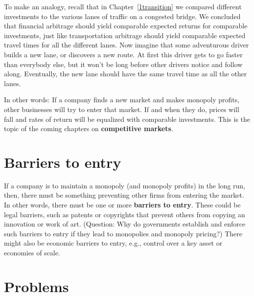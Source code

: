 To make an analogy, recall that in Chapter~\ref{1transition} we compared different investments to the various lanes of traffic on a congested bridge. We concluded that financial arbitrage should yield comparable expected returns for comparable investments, just like transportation arbitrage should yield comparable expected travel times for all the different lanes. Now imagine that some adventurous driver builds a new lane, or discovers a new route. At first this driver gets to go faster than everybody else, but it won't be long before other drivers notice and follow along. Eventually, the new lane should have the same travel time as all the other lanes.

In other words: If a company finds a new market and makes monopoly profits, other businesses will try to enter that market. If and when they do, prices will fall and rates of return will be equalized with comparable investments. This is the topic of the coming chapters on \textbf{competitive markets}.


\section{Barriers to entry}

If a company is to maintain a monopoly (and monopoly profits) in the long run, then, there must be something preventing other firms from entering the market. In other words, there must be one or more \textbf{barriers to entry}. These could be legal barriers, such as patents or copyrights that prevent others from copying an innovation or work of art. (Question: Why do governments establish and enforce such barriers to entry if they lead to monopolies and monopoly pricing?) There might also be economic barriers to entry, e.g., control over a key asset or economies of scale.


%
%
%





\bigskip
\bigskip
\section*{Problems}

